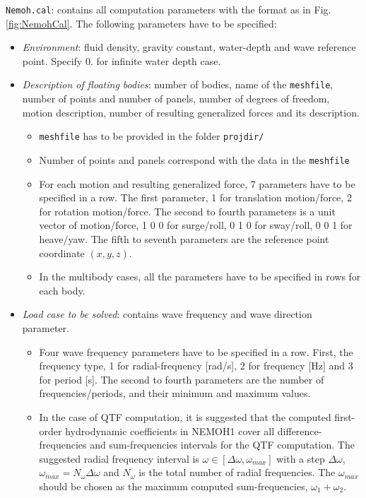 \documentclass[12pt,a4paper,titlepage]{article}
\begin{document}
\texttt{Nemoh.cal}: contains all computation parameters with the format as in Fig. \ref{fig:NemohCal}. The following parameters have to be specified:
\begin{itemize}
\item \emph{Environment}: fluid density, gravity constant, water-depth and wave reference point.  Specify $0.$ for infinite water depth case.
\item \emph{Description of floating bodies}: number of bodies, name of the \texttt{meshfile}, number of points and number of panels, number of degrees of freedom, motion description, number of resulting generalized forces and its description.
\begin{itemize}
\item \texttt{meshfile} has to be provided in the folder \texttt{projdir/}
\item Number of points and panels correspond with the data in the \texttt{meshfile}
\item For each motion and resulting generalized force, 7 parameters have to be specified in a row. The first parameter, 1 for translation motion/force, 2 for rotation motion/force. The second to fourth parameters is a unit vector of motion/force, 1 0 0 for surge/roll, 0 1 0 for sway/roll, 0 0 1 for heave/yaw. The fifth to seventh parameters are the reference point coordinate $(x,y,z)$.
\item In the multibody cases, all the parameters have to be specified in rows for each body.
\end{itemize}
\item \emph{Load case to be solved}: contains wave frequency and wave direction parameter.
\begin{itemize}
\item Four wave frequency parameters have to be specified in a row. First, the frequency type, 1 for radial-frequency [rad/s], 2 for frequency [Hz] and 3 for period [s]. The second to fourth parameters are the number of frequencies/periods, and their minimum and maximum values.
\item In the case of QTF computation, it is suggested that the computed first-order hydrodynamic coefficients in NEMOH1 cover all difference-frequencies and sum-frequencies intervals for the QTF computation. The suggested radial frequency interval is $\omega \in [\Delta \omega, \omega_{max}]$ with a step $\Delta \omega$,  $\omega_{max}=N_{\omega}\Delta \omega$ and $N_{\omega}$ is the total number of radial frequencies. The $\omega_{max}$ should be chosen as the maximum computed sum-frequencies, $\omega_1+\omega_2$.

\end{itemize}
\end{itemize}
\end{document}
